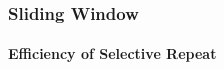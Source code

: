 \begin{frame}		
	\frametitle{Sliding Window}
	\framesubtitle{Efficiency of Selective Repeat}
	
	\begin{columns}
		\begin{column}{0.5\textwidth}  %
			\begin{center}
				\begin{figure}[H]
				\end{figure}
			\end{center}
			\centering 
		\end{column}
		\begin{column}{0.5\textwidth}  %
			\begin{center}
				\begin{figure}[H]
				\end{figure}
			\end{center}
			\centering 
		\end{column}
	\end{columns}
	
	
\end{frame}